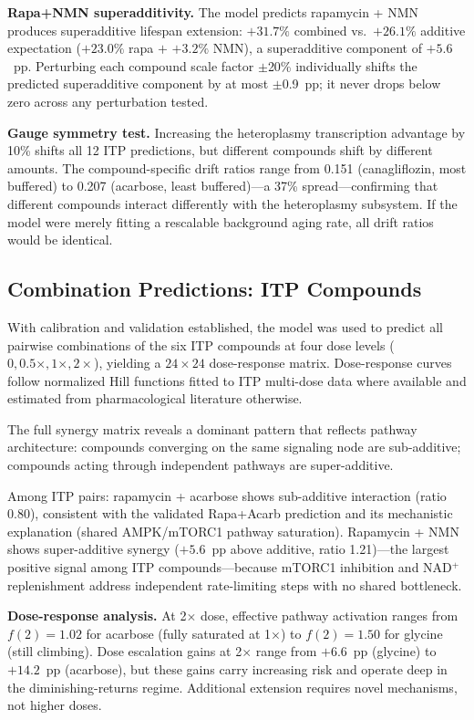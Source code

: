\documentclass[11pt]{article}
\begin{document}

\textbf{Rapa+NMN superadditivity.} The model predicts rapamycin + NMN produces superadditive lifespan extension: $+31.7\%$ combined vs.\ $+26.1\%$ additive expectation ($+23.0\%$ rapa $+$ $+3.2\%$ NMN), a superadditive component of $+5.6$~pp. Perturbing each compound scale factor $\pm$20\% individually shifts the predicted superadditive component by at most $\pm$0.9~pp; it never drops below zero across any perturbation tested.

\textbf{Gauge symmetry test.} Increasing the heteroplasmy transcription advantage by 10\% shifts all 12 ITP predictions, but different compounds shift by different amounts. The compound-specific drift ratios range from 0.151 (canagliflozin, most buffered) to 0.207 (acarbose, least buffered)---a 37\% spread---confirming that different compounds interact differently with the heteroplasmy subsystem. If the model were merely fitting a rescalable background aging rate, all drift ratios would be identical.

\subsection{Combination Predictions: ITP Compounds}

With calibration and validation established, the model was used to predict all pairwise combinations of the six ITP compounds at four dose levels ($0, 0.5\times, 1\times, 2\times$), yielding a $24 \times 24$ dose-response matrix. Dose-response curves follow normalized Hill functions fitted to ITP multi-dose data where available and estimated from pharmacological literature otherwise.

The full synergy matrix reveals a dominant pattern that reflects pathway architecture: compounds converging on the same signaling node are sub-additive; compounds acting through independent pathways are super-additive.


Among ITP pairs: rapamycin + acarbose shows sub-additive interaction (ratio 0.80), consistent with the validated Rapa+Acarb prediction and its mechanistic explanation (shared AMPK/mTORC1 pathway saturation). Rapamycin + NMN shows super-additive synergy ($+5.6$~pp above additive, ratio 1.21)---the largest positive signal among ITP compounds---because mTORC1 inhibition and NAD$^+$ replenishment address independent rate-limiting steps with no shared bottleneck.

\textbf{Dose-response analysis.} At 2$\times$ dose, effective pathway activation ranges from $f(2) = 1.02$ for acarbose (fully saturated at 1$\times$) to $f(2) = 1.50$ for glycine (still climbing). Dose escalation gains at 2$\times$ range from $+6.6$~pp (glycine) to $+14.2$~pp (acarbose), but these gains carry increasing risk and operate deep in the diminishing-returns regime. Additional extension requires novel mechanisms, not higher doses.
\end{document}
